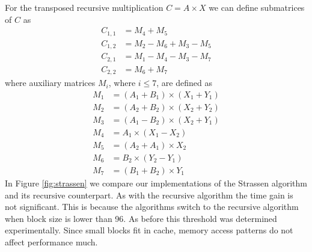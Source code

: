 \documentclass[a4paper,11pt]{article}
\begin{document}



For the transposed recursive multiplication $C = A \times X$ we can define submatrices of $C$ as
\begin{align*}
C_{1,1} &= M_{4} + M_{5}\\
C_{1,2} &= M_{2} - M_{6} + M_{3} - M_{5} \\
C_{2,1} &= M_{1} - M_{4} - M_{3} - M_{7} \\
C_{2,2} &= M_{6} + M_{7}
\end{align*}
where auxiliary matrices $M_{i}$, where $i \leq 7$, are defined as
\begin{align*}
M_{1} &= (A_{1} + B_{1}) \times (X_{1} + Y_{1}) \\
M_{2} &= (A_{2} + B_{2}) \times (X_{2} + Y_{2}) \\
M_{3} &= (A_{1} - B_{2}) \times (X_{2} + Y_{1}) \\
M_{4} &= A_{1} \times (X_{1} - X_{2}) \\
M_{5} &= (A_{2} + A_{1}) \times X_{2} \\
M_{6} &= B_{2} \times (Y_{2} - Y_{1}) \\
M_{7} &= (B_{1} + B_{2}) \times Y_{1}
\end{align*}
In Figure \ref{fig:strassen} we compare our implementations of the Strassen algorithm and its recursive counterpart. As with the recursive algorithm the time gain is not significant. This is because the algorithms switch to the recursive algorithm when block size is lower than 96. As before this threshold was determined experimentally. Since small blocks fit in cache, memory access patterns do not affect performance much.
\end{document}
